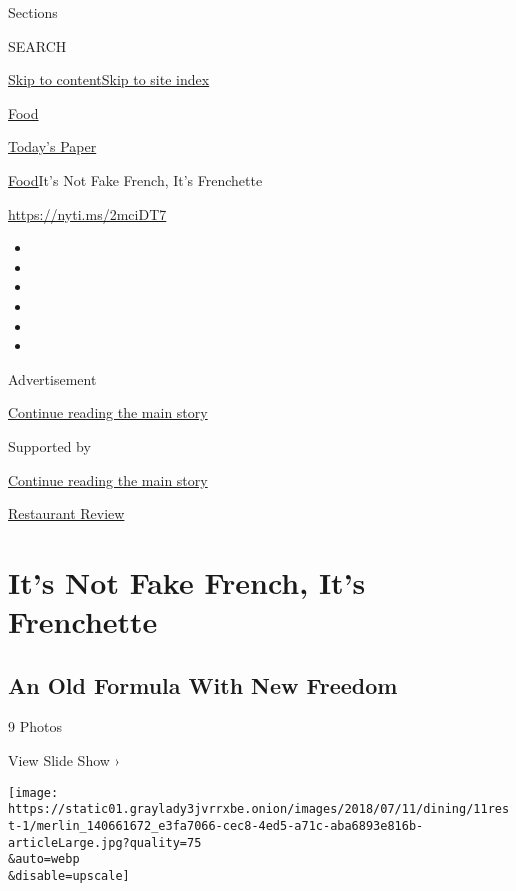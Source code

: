 Sections

SEARCH

\protect\hyperlink{site-content}{Skip to
content}\protect\hyperlink{site-index}{Skip to site index}

\href{https://www.nytimes3xbfgragh.onion/section/food}{Food}

\href{https://myaccount.nytimes3xbfgragh.onion/auth/login?response_type=cookie\&client_id=vi}{}

\href{https://www.nytimes3xbfgragh.onion/section/todayspaper}{Today's
Paper}

\href{/section/food}{Food}\textbar{}It's Not Fake French, It's
Frenchette

\url{https://nyti.ms/2mciDT7}

\begin{itemize}
\item
\item
\item
\item
\item
\item
\end{itemize}

Advertisement

\protect\hyperlink{after-top}{Continue reading the main story}

Supported by

\protect\hyperlink{after-sponsor}{Continue reading the main story}

\href{/column/restaurant-review}{Restaurant Review}

\hypertarget{its-not-fake-french-its-frenchette}{%
\section{It's Not Fake French, It's
Frenchette}\label{its-not-fake-french-its-frenchette}}

\href{https://www.nytimes3xbfgragh.onion/slideshow/2018/07/10/dining/frenchette-nyc.html}{}

\hypertarget{an-old-formula-with-new-freedom}{%
\subsection{An Old Formula With New
Freedom}\label{an-old-formula-with-new-freedom}}

9 Photos

View Slide Show ›

\texttt{[image: https://static01.graylady3jvrrxbe.onion/images/2018/07/11/dining/11rest-1/merlin\_140661672\_e3fa7066-cec8-4ed5-a71c-aba6893e816b-articleLarge.jpg?quality=75\\\&auto=webp\\\&disable=upscale]}

